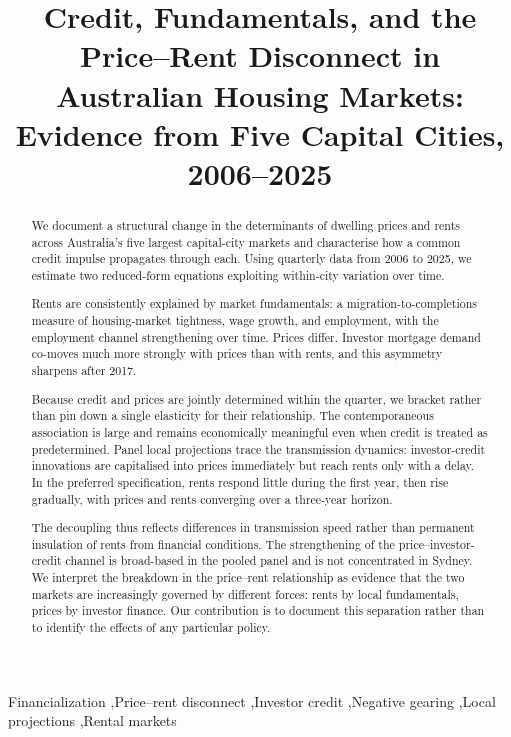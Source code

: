 \documentclass[preprint,11pt,authoryear]{elsarticle}
\begin{document}
\begin{frontmatter}

\title{Credit, Fundamentals, and the Price--Rent Disconnect in
Australian Housing Markets:
Evidence from Five Capital Cities, 2006--2025}
%
%

\begin{abstract}
We document a structural change in the determinants of dwelling prices
and rents across Australia's five largest capital-city markets and
characterise how a common credit impulse propagates through each. Using
quarterly data from 2006 to 2025, we estimate two reduced-form equations
exploiting within-city variation over time.

Rents are consistently explained by market fundamentals: a
migration-to-completions measure of housing-market tightness, wage
growth, and employment, with the employment channel strengthening over
time. Prices differ. Investor mortgage demand co-moves much more strongly
with prices than with rents, and this asymmetry sharpens after 2017.

Because credit and prices are jointly determined within the quarter, we
bracket rather than pin down a single elasticity for their relationship. The contemporaneous
association is large and remains economically meaningful even when credit
is treated as predetermined. Panel local projections trace the transmission dynamics: investor-credit innovations are capitalised into prices immediately but reach rents only with a delay. In the preferred
specification, rents respond little during the first year, then rise
gradually, with prices and rents converging over a three-year horizon.

The decoupling thus reflects differences in transmission speed rather
than permanent insulation of rents from financial conditions. The strengthening of the price--investor-credit channel is broad-based in the pooled panel and is not concentrated in Sydney. We interpret the breakdown in the price--rent
relationship as evidence that the two markets are increasingly governed
by different forces: rents by local fundamentals, prices by investor
finance. Our contribution is to document this separation rather than to
identify the effects of any particular policy.
\end{abstract}

\begin{keyword}
Financialization \sep Price--rent disconnect \sep Investor credit
\sep Negative gearing \sep Local projections \sep Rental markets
\end{keyword}


\end{frontmatter}
\end{document}
